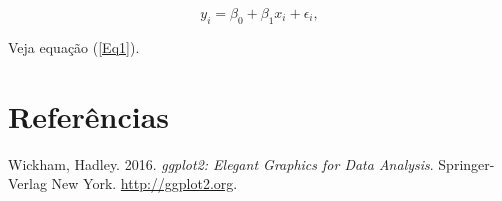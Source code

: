 \documentclass[12pt,brazil,]{article}
\begin{document}
\begin{equation}
y_i=\beta_0 + \beta_1 x_i + \epsilon_i,\label{Eq1}
\end{equation}

Veja equação (\ref{Eq1}).

\hypertarget{referuxeancias}{%
\section*{Referências}\label{referuxeancias}}

\hypertarget{refs}{}
\leavevmode\hypertarget{ref-ggplot2}{}%
Wickham, Hadley. 2016. \emph{ggplot2: Elegant Graphics for Data
Analysis}. Springer-Verlag New York. \url{http://ggplot2.org}.
\end{document}

